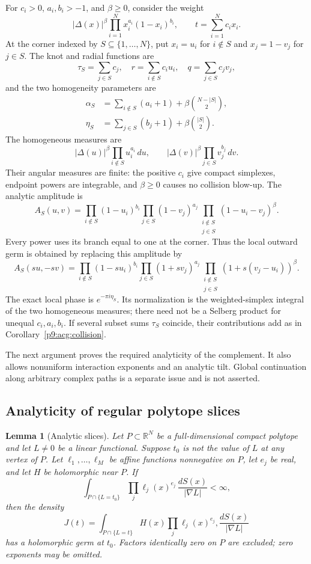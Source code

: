 \documentclass[11pt,a4paper]{article}
\newtheorem{lemma}[theorem]{Lemma}
\theoremstyle{definition}
\theoremstyle{remark}
\numberwithin{equation}{section}
\begin{document}
For $c_i>0$, $a_i,b_i>-1$, and $\beta\geq0$, consider the weight
\[
 |\Delta(x)|^\beta\prod_{i=1}^N x_i^{a_i}(1-x_i)^{b_i},
 \qquad t=\sum_{i=1}^N c_ix_i.
\]
At the corner indexed by $S\subseteq\{1,\ldots,N\}$, put
$x_i=u_i$ for $i\notin S$ and $x_j=1-v_j$ for $j\in S$.
The knot and radial functions are
\[
 \tau_S=\sum_{j\in S}c_j,\quad
 r=\sum_{i\notin S}c_iu_i,\quad q=\sum_{j\in S}c_jv_j,
\]
and the two homogeneity parameters are
\begin{align*}
 \alpha_S&=\sum_{i\notin S}(a_i+1)+\beta\binom{N-|S|}{2},\\
 \eta_S&=\sum_{j\in S}(b_j+1)+\beta\binom{|S|}{2}.
\end{align*}
The homogeneous measures are
\[
 |\Delta(u)|^\beta\prod_{i\notin S}u_i^{a_i}\,du,
 \qquad |\Delta(v)|^\beta\prod_{j\in S}v_j^{b_j}\,dv.
\]
Their angular measures are finite: the positive $c_i$ give compact
simplexes, endpoint powers are integrable, and $\beta\geq0$ causes
no collision blow-up. The analytic amplitude is
\[
 A_S(u,v)=\prod_{i\notin S}(1-u_i)^{b_i}
          \prod_{j\in S}(1-v_j)^{a_j}
          \prod_{\substack{i\notin S\\j\in S}}(1-u_i-v_j)^\beta.
\]
Every power uses its branch equal to one at the corner. Thus the
local outward germ is obtained by replacing this amplitude by
\[
 A_S(su,-sv)=\prod_{i\notin S}(1-su_i)^{b_i}
          \prod_{j\in S}(1+sv_j)^{a_j}
          \prod_{\substack{i\notin S\\j\in S}}
                    (1+s(v_j-u_i))^\beta.
\]
The exact local phase is $e^{-\pi i\eta_S}$. Its normalization is
the weighted-simplex integral of the two homogeneous measures;
there need not be a Selberg product for unequal $c_i,a_i,b_i$.
If several subset sums $\tau_S$ coincide, their contributions add
as in Corollary~\ref{p9:acg:collision}.

The next argument proves the required analyticity of the complement.
It also allows nonuniform interaction exponents and an analytic tilt.
Global continuation along arbitrary complex paths is a separate issue
and is not asserted.

\subsection{Analyticity of regular polytope slices}

\begin{lemma}[Analytic slices]\label{p9:acg:polytope}
Let $P\subset\mathbb R^N$ be a full-dimensional compact polytope and
let $L\ne0$ be a linear functional. Suppose $t_0$ is not the value of $L$
at any vertex of $P$. Let $\ell_1,\ldots,\ell_M$ be affine functions
nonnegative on $P$, let $e_j$ be real, and let $H$ be holomorphic near
$P$. If
\[
 \int_{P\cap\{L=t_0\}}\prod_j\ell_j(x)^{e_j}\,
                                  \frac{dS(x)}{|\nabla L|}<\infty,
\]
then the density
\[
 J(t)=\int_{P\cap\{L=t\}}H(x)\prod_j\ell_j(x)^{e_j},
                                  \frac{dS(x)}{|\nabla L|}
\]
has a holomorphic germ at $t_0$. Factors identically zero on $P$
are excluded; zero exponents may be omitted.
\end{lemma}
\end{document}
